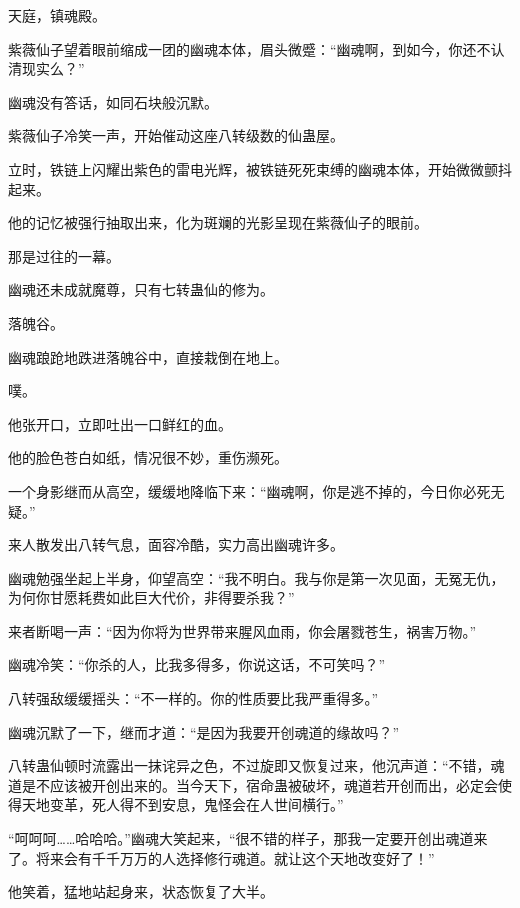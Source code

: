 
\begin{this_body}



天庭，镇魂殿。

紫薇仙子望着眼前缩成一团的幽魂本体，眉头微蹙：“幽魂啊，到如今，你还不认清现实么？”

幽魂没有答话，如同石块般沉默。

紫薇仙子冷笑一声，开始催动这座八转级数的仙蛊屋。

立时，铁链上闪耀出紫色的雷电光辉，被铁链死死束缚的幽魂本体，开始微微颤抖起来。

他的记忆被强行抽取出来，化为斑斓的光影呈现在紫薇仙子的眼前。

那是过往的一幕。

幽魂还未成就魔尊，只有七转蛊仙的修为。

落魄谷。

幽魂踉跄地跌进落魄谷中，直接栽倒在地上。

噗。

他张开口，立即吐出一口鲜红的血。

他的脸色苍白如纸，情况很不妙，重伤濒死。

一个身影继而从高空，缓缓地降临下来：“幽魂啊，你是逃不掉的，今日你必死无疑。”

来人散发出八转气息，面容冷酷，实力高出幽魂许多。

幽魂勉强坐起上半身，仰望高空：“我不明白。我与你是第一次见面，无冤无仇，为何你甘愿耗费如此巨大代价，非得要杀我？”

来者断喝一声：“因为你将为世界带来腥风血雨，你会屠戮苍生，祸害万物。”

幽魂冷笑：“你杀的人，比我多得多，你说这话，不可笑吗？”

八转强敌缓缓摇头：“不一样的。你的性质要比我严重得多。”

幽魂沉默了一下，继而才道：“是因为我要开创魂道的缘故吗？”

八转蛊仙顿时流露出一抹诧异之色，不过旋即又恢复过来，他沉声道：“不错，魂道是不应该被开创出来的。当今天下，宿命蛊被破坏，魂道若开创而出，必定会使得天地变革，死人得不到安息，鬼怪会在人世间横行。”

“呵呵呵……哈哈哈。”幽魂大笑起来，“很不错的样子，那我一定要开创出魂道来了。将来会有千千万万的人选择修行魂道。就让这个天地改变好了！”

他笑着，猛地站起身来，状态恢复了大半。


\end{this_body}
